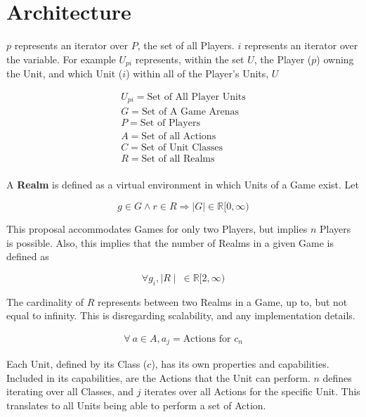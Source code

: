 \documentclass[10pt, titlepage, twocolumn]{article}
\newcommand{\ii}{\indent\indent}
\begin{document}
\section{Architecture}
\ii

\(p\) represents an iterator over \(P\), the set of all Players. \(i\) represents an iterator over the variable. For example \(U_{pi}\) represents, within the set \(U\), the Player (\(p\)) owning the Unit, and which Unit (\(i\)) within all of the Player's Units, \(U\)

\begin{eqnarray} \label{eq:3}
U_{pi} = {\text{Set of All Player Units}}\\
G = {\text{Set of A Game Arenas}}\\
P = {\text{Set of Players}}\\
A = {\text{Set of all Actions}}\\
C = {\text{Set of Unit Classes}}\\
R = {\text{Set of all Realms}}\\
\end{eqnarray}

A \textbf{Realm} is defined as a virtual environment in which Units of a Game exist. Let

\begin{equation} \label{eq:basic_not}
	g \in G \wedge r \in R \Rightarrow \mid G \mid \in \mathbb{R} [0,\infty)
\end{equation}
	
	
This proposal accommodates Games for only two Players, but implies \(n\) Players is possible. Also, this implies that the number of Realms in a given Game is defined as	

\begin{equation} \label{eq:realms_num}
	\forall g_i, \mid R \mid \ \in \mathbb{R} [2,\infty)
\end{equation}

\noindent
The cardinality of $R$ represents between two Realms in a Game, up to, but not equal to infinity. This is disregarding scalability, and any implementation details.
	
\begin{eqnarray} \label{eq:actions_eq}	
\forall \ a \in A, a_j = \text{Actions for \(c_n\)}
\end{eqnarray}


Each Unit, defined by its Class (\(c\)), has its own properties and capabilities. Included in its capabilities, are the Actions that the Unit can perform. \(n\) defines iterating over all Classes, and \(j\) iterates over all Actions for the specific Unit. This translates to all Units being able to perform a set of Action.
\end{document}
